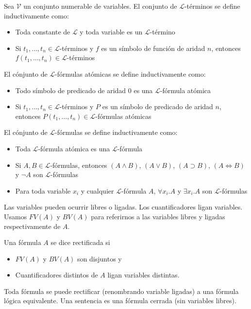 Sea $\mathcal{V}$ un conjunto numerable de variables. El conjunto de $\mathcal{L}$-términos se define inductivamente como:
\begin{itemize}
  \item Toda constante de $\mathcal{L}$ y toda variable es un $\mathcal{L}$-término
  \item Si $t_1,\dots,t_n \in \mathcal{L}$-términos y $f$ es un símbolo de función de aridad $n$, entonces $f(t_1,\dots,t_n) \in \mathcal{L}$-términos
\end{itemize}

El cónjunto de $\mathcal{L}$-fórmulas atómicas se define inductivamente como:
\begin{itemize}
  \item Todo símbolo de predicado de aridad 0 es una $\mathcal{L}$-fórmula atómica
  \item Si $t_1,\dots,t_n \in \mathcal{L}$-términos y $P$ es un símbolo de predicado de aridad $n$, entonces $P(t_1,\dots,t_n) \in \mathcal{L}$-fórmulas atómicas
\end{itemize}

El cónjunto de $\mathcal{L}$-fórmulas se define inductivamente como:
\begin{itemize}
  \item Toda $\mathcal{L}$-fórmula atómica es una $\mathcal{L}$-fórmula
  \item Si $A,B \in \mathcal{L}$-fórmulas, entonces $(A \land B)$, $(A \lor B)$, $(A \supset B)$, $(A \iff B)$ y $\lnot A$ son $\mathcal{L}$-fórmulas
  \item Para toda variable $x_i$ y cualquier $\mathcal{L}$-fórmula $A$, $\forall x_i.A$ y $\exists x_i.A$ son $\mathcal{L}$-fórmulas
\end{itemize}

Las variables pueden ocurrir libres o ligadas. Los cuantificadores ligan variables. Usamos $FV(A)$ y $BV(A)$ para referirnos a las variables libres y ligadas respectivamente de $A$.

Una fórmula $A$ se dice rectificada si
\begin{itemize}
  \item $FV(A)$ y $BV(A)$ son disjuntos y
  \item Cuantificadores distintos de $A$ ligan variables distintas.
\end{itemize}

Toda fórmula se puede rectificar (renombrando variable ligadas) a una fórmula lógica equivalente. Una sentencia es una fórmula cerrada (sin variables libres).

